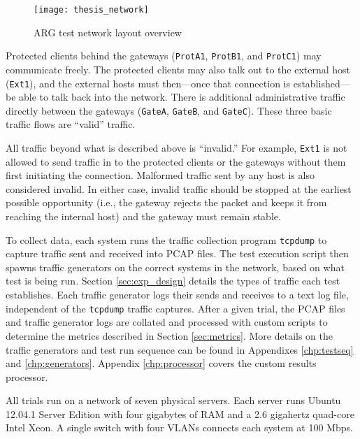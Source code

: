 \begin{figure}
	\centering
	\caption{\ac{ARG} test network layout overview}
	\label{fig:argnetwork}
	\texttt{[image: thesis\_network]}
\end{figure}

\par Protected clients behind the gateways (\texttt{ProtA1}, \texttt{ProtB1}, and \texttt{ProtC1}) may communicate freely. The protected clients may also talk out to the external host (\texttt{Ext1}), and the external hosts must then---once that connection is established---be able to talk back into the network. There is additional administrative traffic directly between the gateways (\texttt{GateA}, \texttt{GateB}, and \texttt{GateC}). These three basic traffic flows are ``valid'' traffic.

\par All traffic beyond what is described above is ``invalid.'' For example, \texttt{Ext1} is not allowed to send traffic in to the protected clients or the gateways without them first initiating the connection. Malformed traffic sent by any host is also considered invalid. In either case, invalid traffic should be stopped at the earliest possible opportunity (i.e., the gateway rejects the packet and keeps it from reaching the internal host) and the gateway must remain stable.

\par To collect data, each system runs the traffic collection program \texttt{tcpdump} to capture traffic sent and received into \ac{PCAP} files. The test execution script then spawns traffic generators on the correct systems in the network, based on what test is being run. Section \ref{sec:exp_design} details the types of traffic each test establishes. Each traffic generator logs their sends and receives to a text log file, independent of the \texttt{tcpdump} traffic captures. After a given trial, the \ac{PCAP} files and traffic generator logs are collated and processed with custom scripts to determine the metrics described in Section \ref{sec:metrics}. More details on the traffic generators and test run sequence can be found in Appendixes \ref{chp:testseq} and \ref{chp:generators}. Appendix \ref{chp:processor} covers the custom results processor. 

\par All trials run on a network of seven physical servers. Each server runs Ubuntu 12.04.1 Server Edition with four gigabytes of \ac{RAM} and a 2.6 gigahertz quad-core Intel Xeon. A single switch with four \acp{VLAN} connects each system at 100 \ac{Mbps}.

